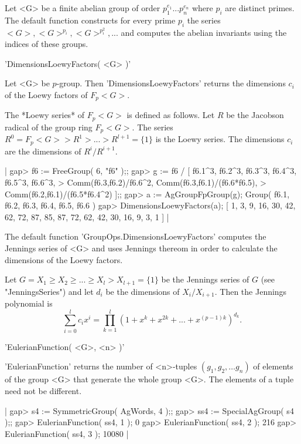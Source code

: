 Let <G> be a finite abelian group of  order $p_1^{e_1}...p_n^{e_n}$ where
$p_i$ are distinct  primes.   The default  function constructs  for every
prime $p_i$ the series  $<G>, <G>^{p_i},  <G>^{p_i^2}, ...$ and  computes
the abelian invariants using the indices of these groups.


'DimensionsLoewyFactors( <G> )'

Let  <G>  be  $p$-group.    Then   'DimensionsLoewyFactors'  returns  the
dimensions $c_i$ of the Loewy factors of $F_p<G>$.

The *Loewy series* of  $F_p<G>$  is defined as  follows.   Let $R$ be the
Jacobson radical of  the group ring $F_p<G>$.  The series $R^0 = F_p<G> >
R^1  > ... > R^{l+1} = \{1\}$ is  the Loewy series. The  dimensions $c_i$
are the dimensions of $R^i / R^{i+1}$.

|    gap> f6 := FreeGroup( 6, "f6" );;
    gap> g := f6 / [ f6.1^3, f6.2^3, f6.3^3, f6.4^3, f6.5^3, f6.6^3,
    >          Comm(f6.3,f6.2)/f6.6^2,  Comm(f6.3,f6.1)/(f6.6*f6.5),
    >          Comm(f6.2,f6.1)/(f6.5*f6.4^2) ];;
    gap> a := AgGroupFpGroup(g);
    Group( f6.1, f6.2, f6.3, f6.4, f6.5, f6.6 )
    gap> DimensionsLoewyFactors(a);      
    [ 1, 3, 9, 16, 30, 42, 62, 72, 87, 85, 87, 72, 62, 42, 30, 16, 9, 3,
      1 ] |

The  default  function  'GroupOps.DimensionsLoewyFactors'  computes   the
Jennings series  of  <G> and uses Jennings thereom in order to  calculate
the dimensions of the Loewy factors.

Let $G = X_1 \geq  X_2 \geq ... \geq X_l > X_{l+1}=\{1\}$ be the Jennings
series of $G$ (see "JenningsSeries") and  let $d_i$ be  the dimensions of
$X_i / X_{i+1}$.  Then the Jennings polynomial is
\begin{displaymath}
\sum_{i=0}^l c_i x^i = \prod_{k=1}^l (1+x^k+x^{2k}+...+x^{(p-1)k})^{d_k}.
\end{displaymath}


'EulerianFunction( <G>, <n> )' 

'EulerianFunction' returns the  number  of <n>-tuples $(g_1, g_2,  \ldots
g_n)$ of elements  of the group <G>  that  generate the  whole group <G>.
The elements of a tuple need not be different.

|    gap> s4 := SymmetricGroup( AgWords, 4 );;
    gap> ss4 := SpecialAgGroup( s4 );;
    gap> EulerianFunction( ss4, 1 );
    0
    gap> EulerianFunction( ss4, 2 );
    216
    gap> EulerianFunction( ss4, 3 );
    10080 |

